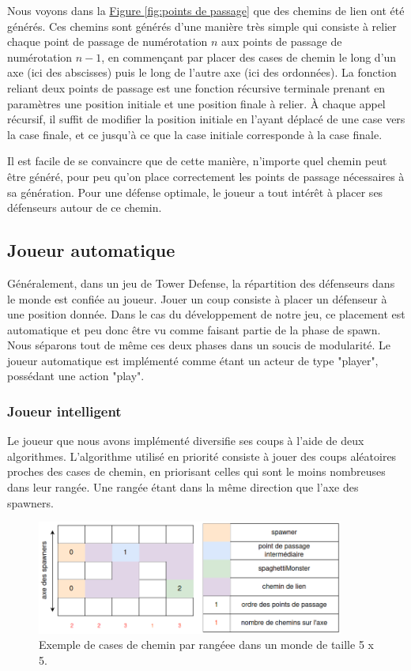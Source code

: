 \documentclass{article}
\begin{document}
Nous voyons dans la \hyperref[fig:points de passage]{Figure \ref{fig:points de passage}} que des chemins de lien ont été générés. Ces chemins sont générés d'une manière très simple qui consiste à relier chaque point de passage de numérotation $n$ aux points de passage de numérotation $n - 1$, en commençant par placer des cases de chemin le long d'un axe (ici des abscisses) puis le long de l'autre axe (ici des ordonnées). La fonction reliant deux points de passage est une fonction récursive terminale prenant en paramètres une position initiale et une position finale à relier. À chaque appel récursif, il suffit de modifier la position initiale en l'ayant déplacé de une case vers la case finale, et ce jusqu'à ce que la case initiale corresponde à la case finale.

Il est facile de se convaincre que de cette manière, n'importe quel chemin peut être généré, pour peu qu'on place correctement les points de passage nécessaires à sa génération.
Pour une défense optimale, le joueur a tout intérêt à placer ses défenseurs autour de ce chemin.

\subsection{Joueur automatique}

Généralement, dans un jeu de Tower Defense, la répartition des défenseurs dans le monde est confiée au joueur. Jouer un coup consiste à placer un défenseur à une position donnée. Dans le cas du développement de notre jeu, ce placement est automatique et peu donc être vu comme faisant partie de la phase de spawn. Nous séparons tout de même ces deux phases dans un soucis de modularité.
Le joueur automatique est implémenté comme étant un acteur de type "player", possédant une action "play".

\subsubsection{Joueur intelligent}

Le joueur que nous avons implémenté diversifie ses coups à l'aide de deux algorithmes.
L'algorithme utilisé en priorité consiste à jouer des coups aléatoires proches des cases de chemin, en priorisant celles qui sont le moins nombreuses dans leur rangée. Une rangée étant dans la même direction que l'axe des spawners.

\begin{figure}[H]
    \centering
    \includegraphics[width = 0.9\textwidth]{points_de_passage_play.png}
    \caption{Exemple de cases de chemin par rangéee dans un monde de taille 5 x 5.}
    \label{fig:points de passage play}
\end{figure}
\end{document}

